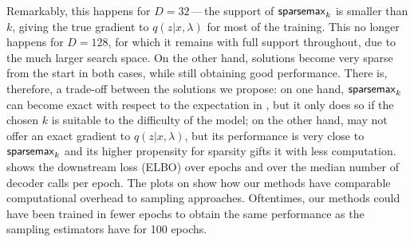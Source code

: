 Remarkably, this happens for $D\!=\!32$\,---\,the support of
$\operatorname{\mathsf{sparsemax}_\text{$k$}}$ is smaller than $k$, giving the true gradient to
$q(z|x, \lambda)$ for most of the training. This no longer
happens for $D\!=\!128$, for which it remains with full support
throughout, due to the much larger search space. On the other hand,
\smap solutions become very sparse from the start in both cases,
while still obtaining good performance. There is, therefore, a
trade-off between the solutions we propose: on one hand,
$\operatorname{\mathsf{sparsemax}_\text{$k$}}$ can become exact with respect to the expectation in
, but it only does so if the chosen $k$ is suitable to
the difficulty of the model; on the other hand, \smap may not offer
an exact gradient to $q(z|x, \lambda)$, but its performance is
very close to $\operatorname{\mathsf{sparsemax}_\text{$k$}}$ and its higher propensity for sparsity
gifts it with less computation.  shows the
downstream loss (ELBO) over epochs and over the median number of
decoder calls per epoch. The plots on 
show how our methods have comparable computational overhead to
sampling approaches. Oftentimes, our methods could have been trained
in fewer epochs to obtain the same performance as the sampling
estimators have for 100 epochs.

